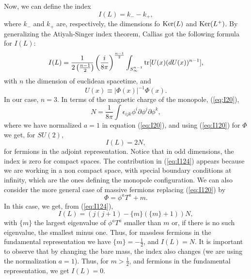 Now,
we can define the index
\begin{equation}
I(L) = k_--k_+,
\label{eq:I123}
\end{equation}
where $k_-$ and $k_+$ are, respectively, the dimensions fo $\hbox
{Ker} (L)$ and $\hbox {Ker} (L^+)$. By generalizing the
Atiyah-Singer index theorem, Callias \cite{Callias} got the following formula
for $I(L)$:
\begin{equation}
I(L) = \frac {1}{2 \left( \frac {n-1}{2} \right) \!} \left( \frac {i}{8 \pi} 
\right)^{\frac {n-1}{2}} \int _{S^{n-1}_{\infty}} \hbox {tr} [ U(x) (dU(x))^{n-1} ],
\label{eq:I124}
\end{equation}
with $n$ the dimension of euclidean spacetime, and
\begin{equation}
U(x) \equiv | \Phi(x) |^{-1} \Phi(x).
\label{eq:I125}
\end{equation}
In our case, $n=3$. In terms of the magnetic charge of the monopole, (\ref{eq:I20}),
\begin{equation}
N = \frac {1}{8\pi} \int \epsilon_{ijk} \phi^{i} \partial
\phi^{j} \partial \phi^{k},
\label{eq:I126}
\end{equation}
where we have normalized $a=1$ in equation (\ref{eq:I20}), and using
(\ref{eq:I120}) for $\Phi$ we get, for $SU(2)$,
\begin{equation}
I(L) = 2 N,
\label{eq:I127}
\end{equation}
for fermions in the adjoint representation. Notice that in odd 
dimensions, the index is zero for compact spaces. The contribution in (\ref{eq:I124}) 
appears because we are working in a non compact space, with special 
boundary conditions at infinity, which are the ones defining the monopole configuration. 
We can also consider
the more general case of massive fermions replacing
(\ref{eq:I120}) by
\begin{equation}
\Phi = \phi^{a} T^{a} +m.
\label{eq:I128}
\end{equation}
In this case, we get, from (\ref{eq:I124}),
\begin{equation}
I(L) = (j(j+1)-\{m\}(\{m\}+1))N,
\label{eq:I129}
\end{equation}
with $\{m\}$ the largest eigenvalue of $\phi^{a} T^{a}$ smaller
than $m$ or, if there is no such eigenvalue, the smallest minus one. Thus, for 
massless fermions in the fundamental representation we have $\{m\}= - \frac {1}{2}$, 
and $I(L)=N$. It is important to observe that by changing the bare mass, the index 
also changes (we are using the normalization $a=1$). Thus, for $m> \frac {1}{2}$, and fermions 
in the fundamental representation, we get $I(L)=0$.


